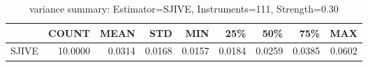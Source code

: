 \begin{table}[ht]
\centering
\caption{variance summary: Estimator=SJIVE, Instruments=111, Strength=0.30}
\begin{tabular}{lrrrrrrrr}
\toprule
 & COUNT & MEAN & STD & MIN & 25\% & 50\% & 75\% & MAX \\
\midrule
SJIVE & 10.0000 & 0.0314 & 0.0168 & 0.0157 & 0.0184 & 0.0259 & 0.0385 & 0.0602 \\
\bottomrule
\end{tabular}
\end{table}

